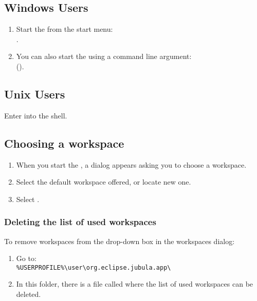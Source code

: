 

\subsection{Windows Users}
\begin{enumerate}
\item Start the \ite{}  from the start menu:\\
.

\item You can also start the \ite{} using a command line argument:\\ 
(). 
\end{enumerate}

\subsection{Unix Users}
Enter  into the shell. 

\subsection{Choosing a workspace}
\begin{enumerate}
\item When you start the \ite{}, a dialog appears asking you to choose a workspace. 
\item Select the default workspace offered, or locate new one. 
 \item Select .
 \end{enumerate}


\subsubsection{Deleting the list of used workspaces}
To remove workspaces from the drop-down box in the workspaces dialog:
\begin{enumerate}
\item Go to: \\
\verb+%USERPROFILE%\user\org.eclipse.jubula.app\  +
\item In this folder, there is a file called  where the list of used workspaces can be deleted. 
\end{enumerate}




